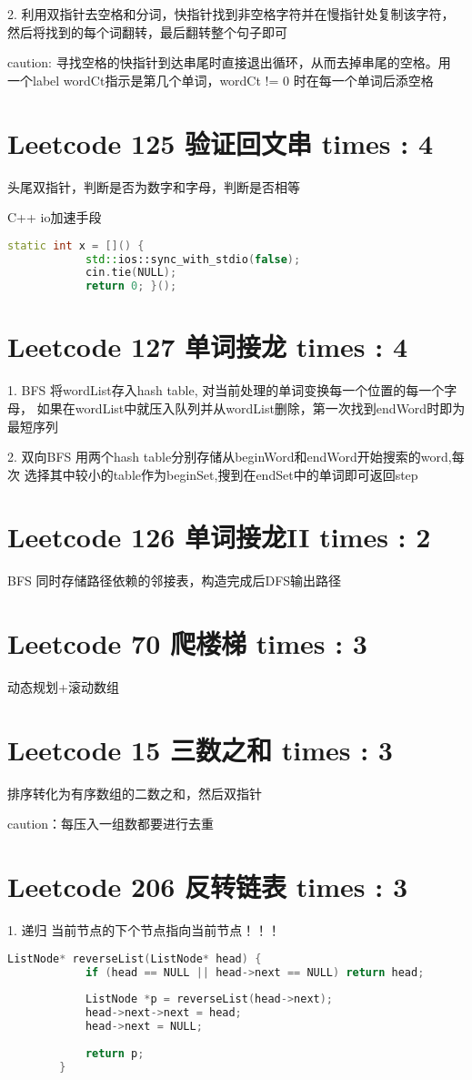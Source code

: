 \documentclass[UTF8]{ctexart}
\begin{document}
2. 利用双指针去空格和分词，快指针找到非空格字符并在慢指针处复制该字符，
然后将找到的每个词翻转，最后翻转整个句子即可

caution: 寻找空格的快指针到达串尾时直接退出循环，从而去掉串尾的空格。用
一个label wordCt指示是第几个单词，wordCt != 0 时在每一个单词后添空格

\section{Leetcode 125 验证回文串 times : 4}
头尾双指针，判断是否为数字和字母，判断是否相等

C++ io加速手段
\begin{framed}
	\begin{lstlisting}[language=C++]
		static int x = []() {
			std::ios::sync_with_stdio(false);
			cin.tie(NULL);
			return 0; }();
	\end{lstlisting}
\end{framed}

\section{Leetcode 127 单词接龙 times : 4}
1. BFS 将wordList存入hash table, 对当前处理的单词变换每一个位置的每一个字母，
如果在wordList中就压入队列并从wordList删除，第一次找到endWord时即为最短序列

2. 双向BFS 用两个hash table分别存储从beginWord和endWord开始搜索的word,每次
选择其中较小的table作为beginSet,搜到在endSet中的单词即可返回step

\section{Leetcode 126 单词接龙II times : 2}
BFS 同时存储路径依赖的邻接表，构造完成后DFS输出路径

\section{Leetcode 70 爬楼梯 times : 3}
动态规划+滚动数组

\section{Leetcode 15 三数之和 times : 3}
排序转化为有序数组的二数之和，然后双指针

caution：每压入一组数都要进行去重

\section{Leetcode 206 反转链表 times : 3}
1. 递归 当前节点的下个节点指向当前节点！！！
\begin{framed}
	\begin{lstlisting}[language=C++]
		ListNode* reverseList(ListNode* head) {
			if (head == NULL || head->next == NULL) return head;
	
			ListNode *p = reverseList(head->next);
			head->next->next = head;
			head->next = NULL;
	
			return p;
		}
	\end{lstlisting}
\end{framed}
\end{document}
